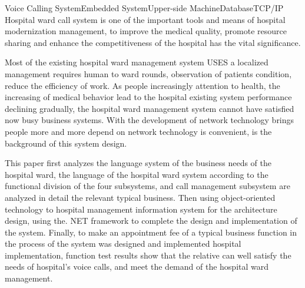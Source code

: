 
\begin{Eabstract}{Voice Calling System}{Embedded System}{Upper-side Machine}{Database}{TCP/IP}
Hospital ward call system is one of the important tools and means of hospital modernization management, to improve the medical quality, promote resource sharing and enhance the competitiveness of the hospital has the vital significance. 

Most of the existing hospital ward management system USES a localized management requires human to ward rounds, observation of patients condition, reduce the efficiency of work. As people increasingly attention to health, the increasing of medical behavior lead to the hospital existing system performance declining gradually, the hospital ward management system cannot have satisfied now busy business systems. With the development of network technology brings people more and more depend on network technology is convenient, is the background of this system design. 

This paper first analyzes the language system of the business needs of the hospital ward, the language of the hospital ward system according to the functional division of the four subsystems, and call management subsystem are analyzed in detail the relevant typical business. Then using object-oriented technology to hospital management information system for the architecture design, using the. NET framework to complete the design and implementation of the system. Finally, to make an appointment fee of a typical business function in the process of the system was designed and implemented hospital implementation, function test results show that the relative can well satisfy the needs of hospital's voice calls, and meet the demand of the hospital ward management. 
\end{Eabstract}
